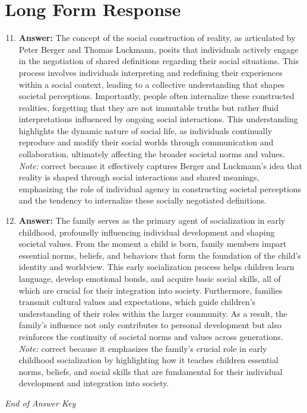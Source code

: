 \documentclass[12pt]{article}
\begin{document}
\section*{Long Form Response}
\begin{enumerate}[label=\arabic*.]
\setcounter{enumi}{10}
\item \textbf{Answer:} The concept of the social construction of reality, as articulated by Peter Berger and Thomas Luckmann, posits that individuals actively engage in the negotiation of shared definitions regarding their social situations. This process involves individuals interpreting and redefining their experiences within a social context, leading to a collective understanding that shapes societal perceptions. Importantly, people often internalize these constructed realities, forgetting that they are not immutable truths but rather fluid interpretations influenced by ongoing social interactions. This understanding highlights the dynamic nature of social life, as individuals continually reproduce and modify their social worlds through communication and collaboration, ultimately affecting the broader societal norms and values.
\\ \textit{Note:} correct because it effectively captures Berger and Luckmann's idea that reality is shaped through social interactions and shared meanings, emphasizing the role of individual agency in constructing societal perceptions and the tendency to internalize these socially negotiated definitions.
\item \textbf{Answer:} The family serves as the primary agent of socialization in early childhood, profoundly influencing individual development and shaping societal values. From the moment a child is born, family members impart essential norms, beliefs, and behaviors that form the foundation of the child's identity and worldview. This early socialization process helps children learn language, develop emotional bonds, and acquire basic social skills, all of which are crucial for their integration into society. Furthermore, families transmit cultural values and expectations, which guide children's understanding of their roles within the larger community. As a result, the family's influence not only contributes to personal development but also reinforces the continuity of societal norms and values across generations.
\\ \textit{Note:} correct because it emphasizes the family's crucial role in early childhood socialization by highlighting how it teaches children essential norms, beliefs, and social skills that are fundamental for their individual development and integration into society.
\end{enumerate}

\vfill
\noindent\textit{End of Answer Key}
\end{document}
